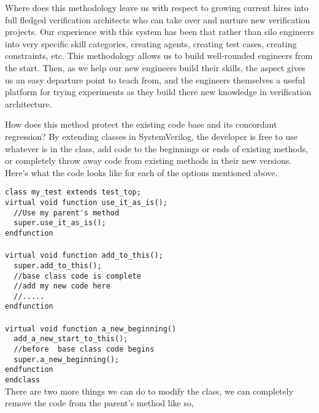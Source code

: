 \documentclass[twocolumn,letterpaper]{IEEEAerospaceCLS}  %
\begin{document}
Where does this methodology leave us with respect to growing current hires into full fledged verification architects who can take over and nurture new verification projects. Our experience with this system has been that rather than silo engineers into very specific skill categories, creating agents, creating test cases, creating constraints, etc. This methodology allows us to build well-rounded engineers from the start. Then, as we help our new engineers build their skills, the aspect gives us an easy departure point to teach from, and the engineers themselves a useful platform for trying experiments as they build there new knowledge in verification architecture.

How does this method protect the existing code base and its concordant regression? By extending classes in SystemVerilog, the developer is free to use whatever is in the class, add code to the beginnings or ends of existing methods, or completely throw away code from existing methods in their new versions. Here's what the code looks like for each of the options mentioned above.

\verb|class my_test extends test_top;|
\\
\verb|virtual void function use_it_as_is();|
\\
\verb|  //Use my parent's method |
\\
\verb|  super.use_it_as_is();|
\\
\verb|endfunction|
\\
\\
\verb|virtual void function add_to_this();|
\\
\verb|  super.add_to_this();|
\\
\verb|  //base class code is complete|
\\
\verb|  //add my new code here|
\\
\verb|  //.....|
\\
\verb|endfunction|
\\
\\
\verb|virtual void function a_new_beginning() |
\\
\verb|  add_a_new_start_to_this();|
\\
\verb|  //before  base class code begins|
\\
\verb|  super.a_new_beginning();|
\\
\verb|endfunction|
\\
\verb|endclass|
\\

There are two more things we can do to modify the class, we can completely remove the code from the parent's method like so,
\end{document}
